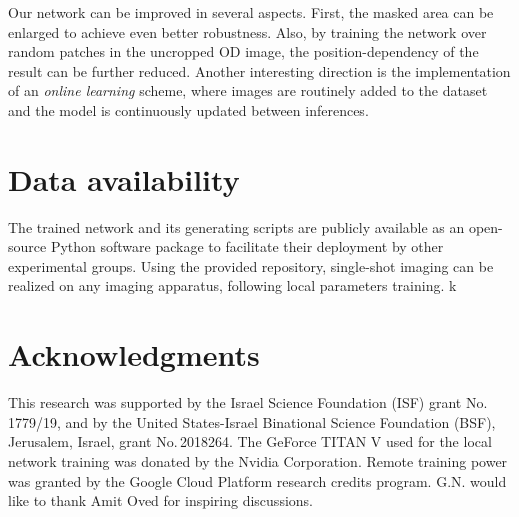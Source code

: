 \documentclass[twocolumn,groupedaddress,longbibliography]{revtex4-1}
\begin{document}
Our network can be improved in several aspects. First, the masked area can be enlarged to achieve even better robustness. Also, by training the network over random patches in the uncropped OD image, the position-dependency of the result can be further reduced.
Another interesting direction is the implementation of an \emph{online learning} scheme, where images are routinely added to the dataset and the model is continuously updated between inferences.


\section*{Data availability}

The trained network and its generating scripts are publicly available as an open-source Python software package \cite{absDL} to facilitate their deployment by other experimental groups. Using the provided repository, single-shot imaging can be realized on any imaging apparatus, following local parameters training.
 k

\section*{Acknowledgments}

This research was supported by the Israel Science Foundation (ISF) grant  No.\,1779/19, and by the United States-Israel Binational Science Foundation (BSF), Jerusalem, Israel, grant No.\,2018264. The GeForce TITAN V used for the local network training was donated by the Nvidia Corporation. Remote training power was granted by the Google Cloud Platform research credits program. G.N. would like to thank Amit Oved for inspiring discussions.



\end{document}
